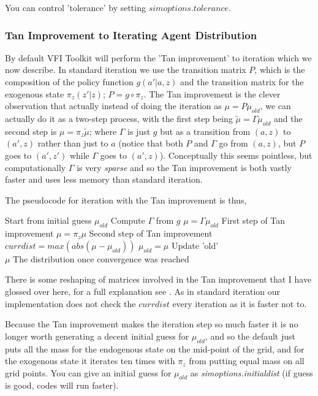 You can control 'tolerance' by setting $simoptions.tolerance$.

\subsubsection{Tan Improvement to Iterating Agent Distribution}
By default VFI Toolkit will perform the 'Tan improvement' \cite*{Tan2020} to iteration which we now describe. In standard iteration we use the transition matrix $P$, which is the composition of the policy function $g(a'|a,z)$ and the transition matrix for the exogenous state $\pi_z(z'|z)$; $P=g \circ \pi_z$. The Tan improvement is the clever observation that actually instead of doing the iteration as $\mu=P \mu_{old}$, we can actually do it as a two-step process, with the first step being $\tilde{\mu}=\Gamma \mu_{old}$ and the second step is $\mu=\pi_z \tilde{\mu}$; where $\Gamma$ is just $g$ but as a transition from $(a,z)$ to $(a',z)$ rather than just to $a$ (notice that both $P$ and $\Gamma$ go from $(a,z)$, but $P$ goes to $(a',z')$ while $\Gamma$ goes to $(a',z)$). Conceptually this seems pointless, but computationally $\Gamma$ is very \textit{sparse} and so the Tan improvement is both vastly faster and uses less memory than standard iteration.

The pseudocode for iteration with the Tan improvement is thus,
\begin{algorithmic}
 \State Start from initial guess $\mu_{old}$
 \State Compute $\Gamma$ from $g$
  \State $\mu=\Gamma \mu_{old}$ \Comment First step of Tan improvement
  \State $\mu=\pi_z \mu$ \Comment Second step of Tan improvement
  \State $currdist=max(abs(\mu-\mu_{old}))$
  \State $\mu_{old}=\mu$ \Comment Update 'old'
 \EndWhile
 \\ \Return $\mu$ \Comment The distribution once convergence was reached
\end{algorithmic}
There is some reshaping of matrices involved in the Tan improvement that I have glossed over here, for a full explanation see \cite{Tan2020}. As in standard iteration our implementation does not check the $currdist$ every iteration as it is faster not to.

Because the Tan improvement makes the iteration step so much faster it is no longer worth generating a decent initial guess for $\mu_{old}$, and so the default just puts all the mass for the endogenous state on the mid-point of the grid, and for the exogenous state it iterates ten times with $\pi_z$ from putting equal mass on all grid points. You can give an initial guess for $\mu_{old}$ as \textit{simoptions.initialdist} (if guess is good, codes will run faster).

